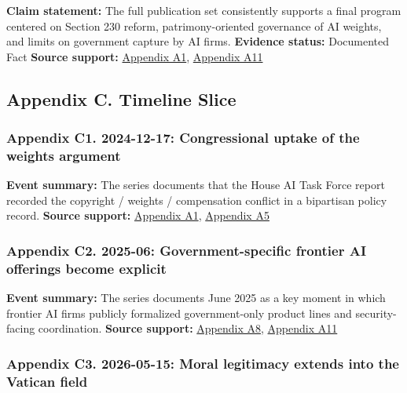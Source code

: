 \documentclass[
  american,
  11pt,
  letterpaper,
]{article}
\begin{document}
\textbf{Claim statement:} The full publication set consistently supports
a final program centered on Section 230 reform, patrimony-oriented
governance of AI weights, and limits on government capture by AI firms.
\textbf{Evidence status:} Documented Fact \textbf{Source support:}
\hyperref[appendix-a1-chapter-00-opening-framework]{Appendix A1},
\hyperref[appendix-a11-chapter-10-what-to-do]{Appendix A11}

\subsection{Appendix C. Timeline
Slice}\label{appendix-c.-timeline-slice}

\subsubsection{Appendix C1. 2024-12-17: Congressional uptake of the
weights
argument}\label{appendix-c1.-2024-12-17-congressional-uptake-of-the-weights-argument}

\textbf{Event summary:} The series documents that the House AI Task
Force report recorded the copyright / weights / compensation conflict in
a bipartisan policy record. \textbf{Source support:}
\hyperref[appendix-a1-chapter-00-opening-framework]{Appendix A1},
\hyperref[appendix-a5-chapter-04-ai-arrives-when-the-human-raw-material-already-exists]{Appendix
A5}

\subsubsection{Appendix C2. 2025-06: Government-specific frontier AI
offerings become
explicit}\label{appendix-c2.-2025-06-government-specific-frontier-ai-offerings-become-explicit}

\textbf{Event summary:} The series documents June 2025 as a key moment
in which frontier AI firms publicly formalized government-only product
lines and security-facing coordination. \textbf{Source support:}
\hyperref[appendix-a8-chapter-07-imperial-control-over-access]{Appendix
A8}, \hyperref[appendix-a11-chapter-10-what-to-do]{Appendix A11}

\subsubsection{Appendix C3. 2026-05-15: Moral legitimacy extends into
the Vatican
field}\label{appendix-c3.-2026-05-15-moral-legitimacy-extends-into-the-vatican-field}
\end{document}
